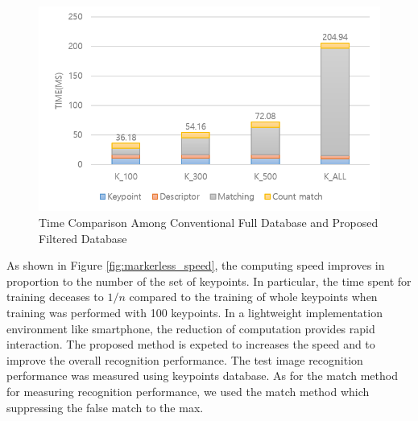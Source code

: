 \begin{figure}[ht!]
\centering
\includegraphics[width=1.0\columnwidth]{4_experiments/ex_time}
\caption{Time Comparison Among Conventional Full Database and Proposed Filtered Database}
\label{fig:markerless_time_experiments}
\end{figure}

\label{fig:markerless_speed}


As shown in Figure \ref{fig:markerless_speed}, the computing speed improves in proportion to the number of the set of keypoints. In particular, the time spent for training deceases to $1/n$ compared to the training of whole keypoints when training was performed with 100 keypoints. In a lightweight implementation environment like smartphone, the reduction of computation provides rapid interaction. The proposed method is expeted to increases the speed and to improve the overall recognition performance. The test image recognition performance was measured using keypoints database. As for the match method for measuring recognition performance, we used the match method\cite{choi_smart_2014} which suppressing the false match to the max. 

